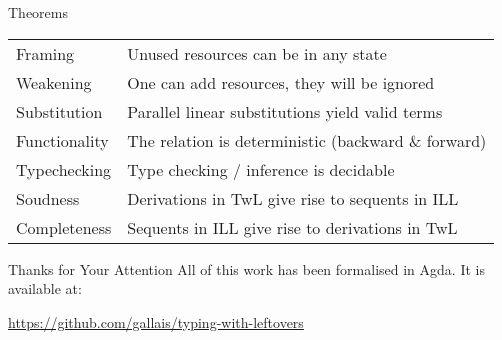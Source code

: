\documentclass{beamer}
\begin{document}
\begin{frame}{Theorems}
\begin{tabular}{ll}
 Framing       & Unused resources can be in any state \\
 Weakening     & One can add resources, they will be ignored \\
 Substitution  & Parallel linear substitutions yield valid terms \\
 Functionality & The relation is deterministic (backward \& forward) \\
 Typechecking  & Type checking / inference is decidable \\
 Soudness      & Derivations in TwL give rise to sequents in ILL \\
 Completeness  & Sequents in ILL give rise to derivations in TwL \\
\end{tabular}
\end{frame}

\begin{frame}[fragile]{Thanks for Your Attention}
All of this work has been formalised in Agda.
It is available at:

\url{https://github.com/gallais/typing-with-leftovers}
\end{frame}
\end{document}
